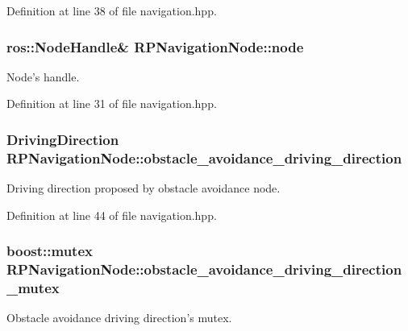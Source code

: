 \-Definition at line 38 of file navigation.\-hpp.

\hypertarget{class_r_p_navigation_node_aed678dff310085f48bed11c3a0daaacc}{
\subsubsection[{node}]{\setlength{\rightskip}{0pt plus 5cm}ros\-::\-Node\-Handle\& {\bf \-R\-P\-Navigation\-Node\-::node}}}\label{class_r_p_navigation_node_aed678dff310085f48bed11c3a0daaacc}
\-Node's handle. 

\-Definition at line 31 of file navigation.\-hpp.

\hypertarget{class_r_p_navigation_node_a4ff70f55e413132242e1fbc433922a03}{
\subsubsection[{obstacle\-\_\-avoidance\-\_\-driving\-\_\-direction}]{\setlength{\rightskip}{0pt plus 5cm}\-Driving\-Direction {\bf \-R\-P\-Navigation\-Node\-::obstacle\-\_\-avoidance\-\_\-driving\-\_\-direction}}}\label{class_r_p_navigation_node_a4ff70f55e413132242e1fbc433922a03}
\-Driving direction proposed by obstacle avoidance node. 

\-Definition at line 44 of file navigation.\-hpp.

\hypertarget{class_r_p_navigation_node_a21ecb936c90af84373c6f831c2ccb05b}{
\subsubsection[{obstacle\-\_\-avoidance\-\_\-driving\-\_\-direction\-\_\-mutex}]{\setlength{\rightskip}{0pt plus 5cm}boost\-::mutex {\bf \-R\-P\-Navigation\-Node\-::obstacle\-\_\-avoidance\-\_\-driving\-\_\-direction\-\_\-mutex}}}\label{class_r_p_navigation_node_a21ecb936c90af84373c6f831c2ccb05b}
\-Obstacle avoidance driving direction's mutex. 

